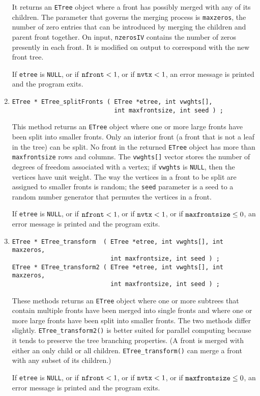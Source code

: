 \begin{enumerate}
It returns an {\tt ETree} object where a front has
possibly merged with any of its children.
The parameter that governs the merging process is {\tt maxzeros},
the number of zero entries that can be introduced by merging
the children and parent front together.
On input, {\tt nzerosIV} contains the number of zeros presently in
each front.
It is modified on output to correspond with the new front tree.
\par {}
If {\tt etree} is {\tt NULL},
or if ${\tt nfront} < 1$,
or if ${\tt nvtx} < 1$,
an error message is printed and the program exits.
\item
\begin{verbatim}
ETree * ETree_splitFronts ( ETree *etree, int vwghts[], 
                            int maxfrontsize, int seed ) ;
\end{verbatim}
This method returns an {\tt ETree} object where one or more large
fronts have been split into smaller fronts.
Only an interior front (a front that is not a leaf in the tree)
can be split.
No front in the returned {\tt ETree} object has more than 
{\tt maxfrontsize} rows and columns.
The {\tt vwghts[]} vector stores the number of degrees of freedom
associated with a vertex; if {\tt vwghts} is {\tt NULL}, then the
vertices have unit weight.
The way the vertices in a front to be split are assigned to smaller
fronts is random; the {\tt seed} parameter is a seed to a random
number generator that permutes the vertices in a front.
\par {}
If {\tt etree} is {\tt NULL},
or if ${\tt nfront} < 1$,
or if ${\tt nvtx} < 1$,
or if ${\tt maxfrontsize} \le 0$,
an error message is printed and the program exits.
\item
\begin{verbatim}
ETree * ETree_transform  ( ETree *etree, int vwghts[], int maxzeros,
                           int maxfrontsize, int seed ) ;
ETree * ETree_transform2 ( ETree *etree, int vwghts[], int maxzeros,
                           int maxfrontsize, int seed ) ;
\end{verbatim}
These methods returns an {\tt ETree} object where one or more subtrees 
that contain multiple fronts have been merged into single fronts and
where one or more large fronts have been split into smaller fronts.
The two methods differ slightly.
{\tt ETree\_transform2()} is better suited for parallel computing
because it tends to preserve the tree branching properties.
(A front is merged with either an only child or all children.
{\tt ETree\_transform()} can merge a front with any subset of its
children.)
\par {}
If {\tt etree} is {\tt NULL},
or if ${\tt nfront} < 1$,
or if ${\tt nvtx} < 1$,
or if ${\tt maxfrontsize} \le 0$,
an error message is printed and the program exits.
\end{enumerate}

